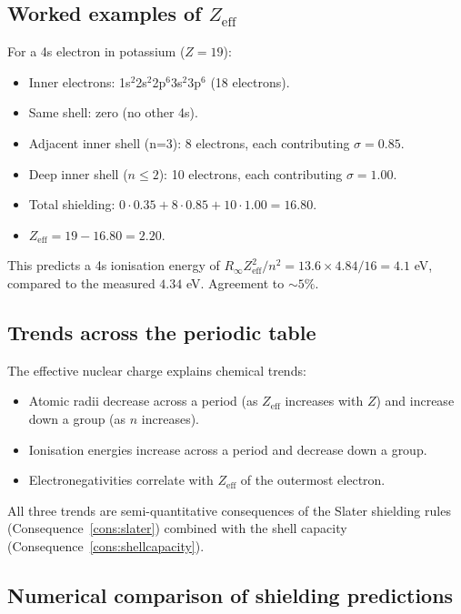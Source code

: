 \documentclass[11pt,twocolumn,a4paper]{article}
\theoremstyle{axiomstyle}
\theoremstyle{conseqstyle}
\theoremstyle{definition}
\theoremstyle{remark}
\begin{document}
\subsection{Worked examples of $Z_{\text{eff}}$}

For a 4s electron in potassium ($Z=19$):
\begin{itemize}
\item Inner electrons: 1s$^{2}$2s$^{2}$2p$^{6}$3s$^{2}$3p$^{6}$ (18 electrons).
\item Same shell: zero (no other 4s).
\item Adjacent inner shell (n=3): 8 electrons, each contributing $\sigma=0.85$.
\item Deep inner shell ($n\le 2$): 10 electrons, each contributing $\sigma=1.00$.
\item Total shielding: $0\cdot 0.35+8\cdot 0.85+10\cdot 1.00=16.80$.
\item $Z_{\text{eff}}=19-16.80=2.20$.
\end{itemize}
This predicts a 4s ionisation energy of $R_{\infty}Z_{\text{eff}}^{2}/n^{2}=13.6\times 4.84/16=4.1$ eV, compared to the measured $4.34$ eV. Agreement to $\sim 5\%$.

\subsection{Trends across the periodic table}

The effective nuclear charge explains chemical trends:
\begin{itemize}
\item Atomic radii decrease across a period (as $Z_{\text{eff}}$ increases with $Z$) and increase down a group (as $n$ increases).
\item Ionisation energies increase across a period and decrease down a group.
\item Electronegativities correlate with $Z_{\text{eff}}$ of the outermost electron.
\end{itemize}
All three trends are semi-quantitative consequences of the Slater shielding rules (Consequence~\ref{cons:slater}) combined with the shell capacity (Consequence~\ref{cons:shellcapacity}).

\subsection{Numerical comparison of shielding predictions}
\end{document}
